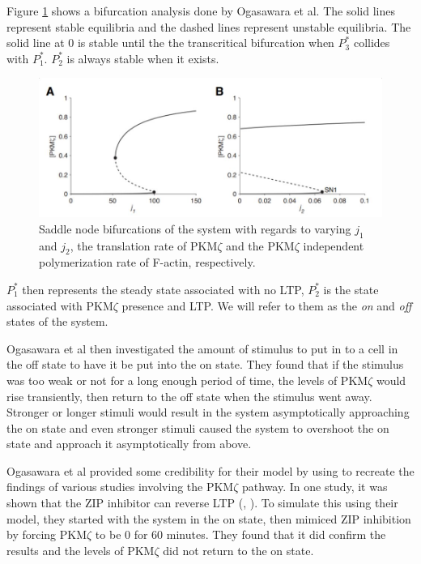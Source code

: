 \documentclass[12pt, a4paper]{article}
\newcommand{\PK}{PKM$\zeta$ }
\newcommand{\pk}{\PK}
\newcommand{\citeapa}[1]{(\citeauthor{#1}, \citeyear{#1})}
\begin{document}
Figure \ref{bifur} shows a bifurcation analysis done by Ogasawara et al. The solid lines represent stable equilibria and the dashed lines represent unstable equilibria. The solid line at 0 is stable until the the transcritical bifurcation when $P_3^*$ collides with $P^*_1$. $P_2^*$ is always stable when it exists.
\begin{figure}[H]
    \centering
    \includegraphics[width = \textwidth]{pics/bifurcations.JPG}
    \caption{Saddle node bifurcations of the system with regards to varying $j_1$ and $j_2$, the translation rate of \pk and the \pk independent polymerization rate of F-actin, respectively.}
    \label{bifur}
\end{figure}

$P^*_1$ then represents the steady state associated with no LTP, $P^*_2$ is the state associated with \pk presence and LTP. We will refer to them as the \emph{on} and \emph{off} states of the system. 

Ogasawara et al then investigated the amount of stimulus to put in to a cell in the off state to have it be put into the on state. They found that if the stimulus was too weak or not for a long enough period of time, the levels of \pk would rise transiently, then return to the off state when the stimulus went away. Stronger or longer stimuli would result in the system asymptotically approaching the on state and even stronger stimuli caused the system to overshoot the on state and approach it asymptotically from above.

Ogasawara et al provided some credibility for their model by using to recreate the findings of various studies involving the \pk pathway. In one study, it was shown that the ZIP inhibitor can reverse LTP \citeapa{ZIPbois}. To simulate this using their model, they started with the system in the on state, then mimiced ZIP inhibition by forcing \pk to be 0 for 60 minutes. They found that it did confirm the results and the levels of \pk did not return to the on state. 
\end{document}
